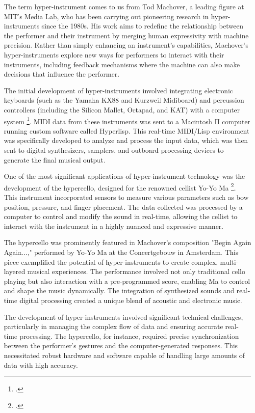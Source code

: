 \documentclass[12pt,twoside,maitrise]{dms_ks}
\theoremstyle{definition}
\begin{document}
The term hyper-instrument comes to us from Tod Machover, a leading figure at MIT's Media Lab, who has been carrying out pioneering research in hyper-instruments since the 1980s. 
His work aims to redefine the relationship between the performer and their instrument by merging human expressivity with machine precision. 
Rather than simply enhancing an instrument's capabilities, Machover's hyper-instruments explore new ways for performers to interact with their instruments, including feedback mechanisms where the machine can also make decisions that influence the performer.

The initial development of hyper-instruments involved integrating electronic keyboards (such as the Yamaha KX88 and Kurzweil Midiboard) and percussion controllers (including the Silicon Mallet, Octapad, and KAT) with a computer system \footcite{machover_hyper-instruments_1989}. 
MIDI data from these instruments was sent to a Macintosh II computer running custom software called Hyperlisp. 
This real-time MIDI/Lisp environment was specifically developed to analyze and process the input data, which was then sent to digital synthesizers, samplers, and outboard processing devices to generate the final musical output.

One of the most significant applications of hyper-instrument technology was the development of the hypercello, designed for the renowned cellist Yo-Yo Ma \footcite{levenson_taming_1994}. 
This instrument incorporated sensors to measure various parameters such as bow position, pressure, and finger placement. 
The data collected was processed by a computer to control and modify the sound in real-time, allowing the cellist to interact with the instrument in a highly nuanced and expressive manner.

The hypercello was prominently featured in Machover's composition "Begin Again Again...," performed by Yo-Yo Ma at the Concertgebouw in Amsterdam. 
This piece exemplified the potential of hyper-instruments to create complex, multi-layered musical experiences. 
The performance involved not only traditional cello playing but also interaction with a pre-programmed score, enabling Ma to control and shape the music dynamically. 
The integration of synthesized sounds and real-time digital processing created a unique blend of acoustic and electronic music.

The development of hyper-instruments involved significant technical challenges, particularly in managing the complex flow of data and ensuring accurate real-time processing. 
The hypercello, for instance, required precise synchronization between the performer's gestures and the computer-generated responses. 
This necessitated robust hardware and software capable of handling large amounts of data with high accuracy.
\end{document}
